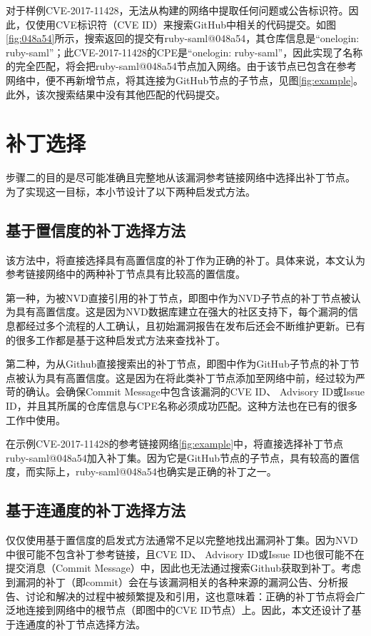 \begin{exmp}
对于样例CVE-2017-11428，\tool 无法从构建的网络中提取任何问题或公告标识符。因此，\tool 仅使用CVE标识符（CVE ID）来搜索GitHub中相关的代码提交。如图\ref{fig:048a54}所示，搜索返回的提交有ruby-saml@048a54，其仓库信息是“onelogin: ruby-saml”；此CVE-2017-11428的CPE是“onelogin: ruby-saml”，因此实现了名称的完全匹配，\tool 将会把ruby-saml@048a54节点加入网络。由于该节点已包含在参考网络中，\tool 便不再新增节点，将其连接为GitHub节点的子节点，见图\ref{fig:example}。此外，该次搜索结果中没有其他匹配的代码提交。
\end{exmp}   

\section{补丁选择}\label{sec:selection}

步骤二的目的是尽可能准确且完整地从该漏洞参考链接网络中选择出补丁节点。 为了实现这一目标，本小节设计了以下两种启发式方法。

\subsection{基于置信度的补丁选择方法}
该方法中，\tool 将直接选择具有高置信度的补丁作为正确的补丁。具体来说，本文认为参考链接网络中的两种补丁节点具有比较高的置信度。

第一种，为被NVD直接引用的补丁节点，即图中作为NVD子节点的补丁节点被认为具有高置信度。这是因为NVD数据库建立在强大的社区支持下，每个漏洞的信息都经过多个流程的人工确认，且初始漏洞报告在发布后还会不断维护更新。已有的很多工作\cite{duan2019automating, li2016vulpecker, li2018vuldeepecker}都是基于这种启发式方法来查找补丁。

第二种，为从Github直接搜索出的补丁节点，即图中作为GitHub子节点的补丁节点被认为具有高置信度。这是因为在将此类补丁节点添加至网络中前，经过较为严苛的确认。\tool 会确保Commit Message中包含该漏洞的CVE ID、 Advisory ID或Issue ID，并且其所属的仓库信息与CPE名称必须成功匹配。这种方法也在已有的很多工作\cite{you2017semfuzz, Wang2020empirical}中使用。

\begin{exmp}
在示例CVE-2017-11428的参考链接网络\ref{fig:example}中，\tool 将直接选择补丁节点ruby-saml@048a54加入补丁集。因为它是GitHub节点的子节点，具有较高的置信度，而实际上，ruby-saml@048a54也确实是正确的补丁之一。
\end{exmp}

\subsection{基于连通度的补丁选择方法}
仅仅使用基于置信度的启发式方法通常不足以完整地找出漏洞补丁集。因为NVD中很可能不包含补丁参考链接，且CVE ID、 Advisory ID或Issue ID也很可能不在提交消息（Commit Message）中，因此也无法通过搜索Github获取到补丁。考虑到漏洞的补丁（即commit）会在与该漏洞相关的各种来源的漏洞公告、分析报告、讨论和解决的过程中被频繁提及和引用，这也意味着：正确的补丁节点将会广泛地连接到网络中的根节点（即图中的CVE ID节点）上。因此，本文还设计了基于连通度的补丁节点选择方法。

